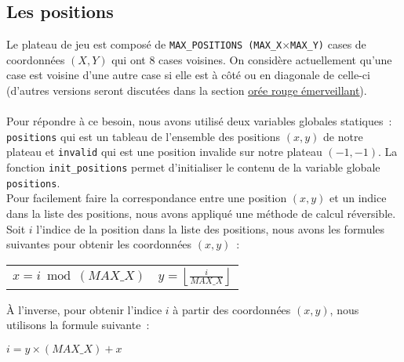 \subsection*{Les positions}
\label{sec:pos}
Le plateau de jeu est composé de \texttt{MAX\_POSITIONS (MAX\_X\(\times\)MAX\_Y)} cases de coordonnées \((X,Y)\) qui ont 8 cases voisines. On considère actuellement qu'une case est voisine d'une autre case si elle est à côté ou en diagonale de celle-ci (d'autres versions seront discutées dans la section \hyperref[sec:ore]{\uline{orée rouge émerveillant}}).\\ \\
Pour répondre à ce besoin, nous avons utilisé deux variables globales statiques~: \textcolor{enseirb}{\texttt{positions}} qui est un tableau de l'ensemble des positions \((x,y)\) de notre plateau et \textcolor{enseirb}{\texttt{invalid}} qui est une position invalide sur notre plateau \((-1,-1)\).
La fonction \texttt{init\_positions} permet d'initialiser le contenu de la variable globale \textcolor{enseirb}{\texttt{positions}}.\\
Pour facilement faire la correspondance entre une position \((x,y)\) et un indice dans la liste des positions, nous avons appliqué une méthode de calcul réversible. Soit \(i\) l'indice de la position dans la liste des positions, nous avons les formules suivantes pour obtenir les coordonnées \((x,y)\)~:
\vspace{0.05cm}
\begin{center}
    \begin{tabular}{@{}l@{\hskip 2cm}l@{}}
        \(x = i \bmod (MAX\_X)\) & \(y = \left\lfloor \frac{i}{MAX\_X} \right\rfloor\)
    \end{tabular}
\end{center}
\vspace{0.05cm}
À l'inverse, pour obtenir l'indice \(i\) à partir des coordonnées \((x,y)\), nous utilisons la formule suivante~:
\begin{center}
    \(i = y \times (MAX\_X) + x\)
\end{center}
\vspace{-1cm}
